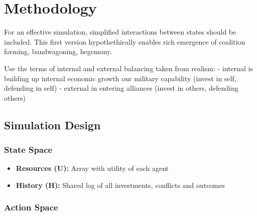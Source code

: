 \section{Methodology}

For an effective simulation, simplified interactions between states should be included. This first version hypothethically enables rich emergence of coalition forming, bandwagoning, hegemony.

Use the terms of internal and external balancing taken from realism:
- internal is building up internal economic growth our military capability (invest in self, defending in self)
- external in entering alliances (invest in others, defending others)

\subsection{Simulation Design}

\subsubsection{State Space}

\begin{itemize}
    \item \textbf{Resources (U):} Array with utility of each agent
    \item \textbf{History (H):} Shared log of all investments, conflicts and outcomes
\end{itemize}

\subsubsection{Action Space}

